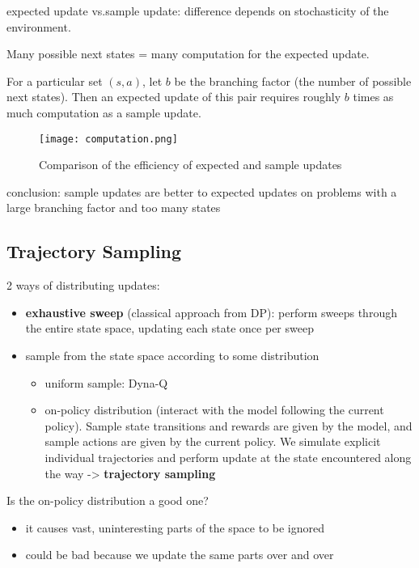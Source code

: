 \documentclass[sutton_barto_notes.tex]{subfiles}
\begin{document}
expected update vs.sample update: difference depends on stochasticity of the environment.

Many possible next states = many computation for the expected update.

For a particular set $(s,a)$, let $b$ be the branching factor (the number of possible next states). Then an expected update of this pair requires roughly $b$ times as much computation as a sample update.

\begin{figure}[h!]
    \centering
    \texttt{[image: computation.png]}
    \caption{ Comparison of the efficiency of expected and sample updates }
\end{figure}

conclusion: sample updates are better to expected updates on problems with a large branching factor and too many states


\subsection{Trajectory Sampling}

2 ways of distributing updates:
\begin{itemize}
\item \textbf{exhaustive sweep} (classical approach from DP): perform sweeps through the entire state space, updating each state once per sweep
\item sample from the state space according to some distribution
\begin{itemize}
	\item uniform sample: Dyna-Q
	\item on-policy distribution (interact with the model following the current policy). Sample state transitions and rewards are given by the model, and sample actions are given by the current policy. We simulate explicit individual trajectories and perform update at the state encountered along the way -> \textbf{trajectory sampling}
\end{itemize}
\end{itemize}

Is the on-policy distribution a good one?
\begin{itemize}
\item it causes vast, uninteresting parts of the space to be ignored
\item could be bad because we update the same parts over and over
\end{itemize}
\end{document}

